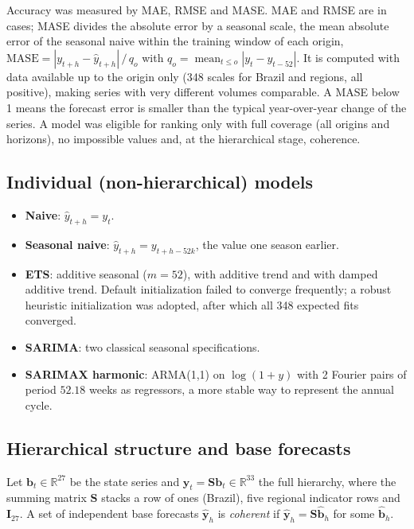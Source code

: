 \documentclass[12pt,a4paper]{article}
\begin{document}
Accuracy was measured by MAE, RMSE and MASE. MAE and RMSE are in cases; MASE divides the absolute error by a seasonal scale, the mean absolute error of the seasonal naive within the training window of each origin, $\mathrm{MASE}=|y_{t+h}-\hat y_{t+h}|\,/\,q_o$ with $q_o=\operatorname{mean}_{t\le o}|y_t-y_{t-52}|$. It is computed with data available up to the origin only (348 scales for Brazil and regions, all positive), making series with very different volumes comparable. A MASE below 1 means the forecast error is smaller than the typical year-over-year change of the series. A model was eligible for ranking only with full coverage (all origins and horizons), no impossible values and, at the hierarchical stage, coherence.

\subsection{Individual (non-hierarchical) models}
\begin{itemize}\setlength\itemsep{0pt}
\item \textbf{Naive}: $\hat y_{t+h}=y_t$.
\item \textbf{Seasonal naive}: $\hat y_{t+h}=y_{t+h-52k}$, the value one season earlier.
\item \textbf{ETS}: additive seasonal ($m=52$), with additive trend and with damped additive trend. Default initialization failed to converge frequently; a robust heuristic initialization was adopted, after which all 348 expected fits converged.
\item \textbf{SARIMA}: two classical seasonal specifications.
\item \textbf{SARIMAX harmonic}: ARMA(1,1) on $\log(1+y)$ with 2 Fourier pairs of period $52.18$ weeks as regressors, a more stable way to represent the annual cycle.
\end{itemize}

\subsection{Hierarchical structure and base forecasts}
Let $\mathbf{b}_t\in\mathbb{R}^{27}$ be the state series and $\mathbf{y}_t=\mathbf{S}\mathbf{b}_t\in\mathbb{R}^{33}$ the full hierarchy, where the summing matrix $\mathbf{S}$ stacks a row of ones (Brazil), five regional indicator rows and $\mathbf{I}_{27}$. A set of independent base forecasts $\hat{\mathbf{y}}_h$ is \emph{coherent} if $\hat{\mathbf{y}}_h=\mathbf{S}\hat{\mathbf{b}}_h$ for some $\hat{\mathbf{b}}_h$.
\end{document}
